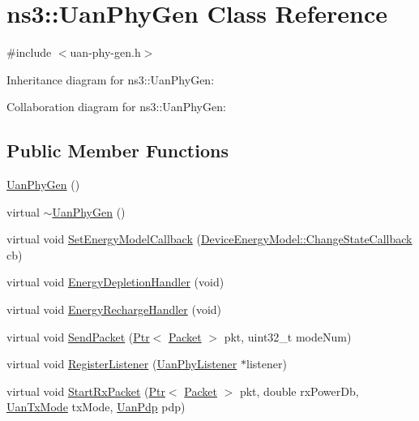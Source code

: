 \hypertarget{classns3_1_1UanPhyGen}{}\section{ns3\+:\+:Uan\+Phy\+Gen Class Reference}
\label{classns3_1_1UanPhyGen}


{\ttfamily \#include $<$uan-\/phy-\/gen.\+h$>$}



Inheritance diagram for ns3\+:\+:Uan\+Phy\+Gen\+:


Collaboration diagram for ns3\+:\+:Uan\+Phy\+Gen\+:
\subsection*{Public Member Functions}
\begin{DoxyCompactItemize}
\item 
\hyperlink{classns3_1_1UanPhyGen_a233a0cade16f6fa26fb85ff8438adc70}{Uan\+Phy\+Gen} ()
\item 
virtual \hyperlink{classns3_1_1UanPhyGen_a6ca42b8ca4e62b11ce898a57760e4c56}{$\sim$\+Uan\+Phy\+Gen} ()
\item 
virtual void \hyperlink{classns3_1_1UanPhyGen_ae3d85a2cd519df8525a6a73194d3d00d}{Set\+Energy\+Model\+Callback} (\hyperlink{classns3_1_1DeviceEnergyModel_a26632ed1b86ee8f6c7fc4c756f0027ad}{Device\+Energy\+Model\+::\+Change\+State\+Callback} cb)
\item 
virtual void \hyperlink{classns3_1_1UanPhyGen_a9fc9ae8608f76b03504e72f555e72aa8}{Energy\+Depletion\+Handler} (void)
\item 
virtual void \hyperlink{classns3_1_1UanPhyGen_a23c81ca50f2ae5b1340347be01b9fa99}{Energy\+Recharge\+Handler} (void)
\item 
virtual void \hyperlink{classns3_1_1UanPhyGen_a7a777fecd8c286f179e05f9708d65213}{Send\+Packet} (\hyperlink{classns3_1_1Ptr}{Ptr}$<$ \hyperlink{classns3_1_1Packet}{Packet} $>$ pkt, uint32\+\_\+t mode\+Num)
\item 
virtual void \hyperlink{classns3_1_1UanPhyGen_a767ee964c460fd8323c96e5a1a7f67fe}{Register\+Listener} (\hyperlink{classns3_1_1UanPhyListener}{Uan\+Phy\+Listener} $\ast$listener)
\item 
virtual void \hyperlink{classns3_1_1UanPhyGen_a33d2cfb97710cff791b87ec7d864107b}{Start\+Rx\+Packet} (\hyperlink{classns3_1_1Ptr}{Ptr}$<$ \hyperlink{classns3_1_1Packet}{Packet} $>$ pkt, double rx\+Power\+Db, \hyperlink{classns3_1_1UanTxMode}{Uan\+Tx\+Mode} tx\+Mode, \hyperlink{classns3_1_1UanPdp}{Uan\+Pdp} pdp)

\end{DoxyCompactItemize}
